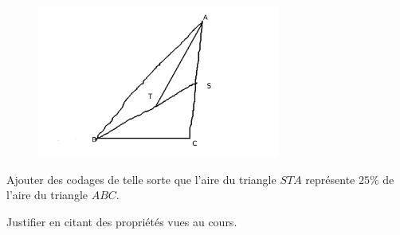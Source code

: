 
\begin{exercice}\label{exo2smath-0252}

\begin{figure}
    \vspace{-2cm}
        \includegraphics[width=8cm]{LBGPooLcyawW.pdf}
\end{figure}

    Ajouter des codages de telle sorte que l'aire du triangle \( STA\) représente \( 25\%\) de l'aire du triangle \( ABC\).

    Justifier en citant des propriétés vues au cours.

    \vspace{2cm}

\end{exercice}
